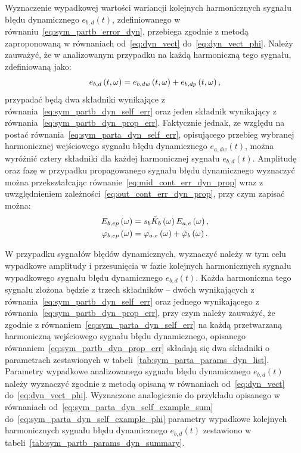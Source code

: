 Wyznaczenie wypadkowej wartości wariancji kolejnych harmonicznych sygnału błędu dynamicznego $e_{b,d}(t)$, zdefiniowanego w równaniu~\eqref{eq:sym_partb_error_dyn}, przebiega zgodnie z metodą zaproponowaną w równaniach od~\eqref{eq:dyn_vect} do~\eqref{eq:dyn_vect_phi}. Należy zauważyć, że w analizowanym przypadku na każdą harmoniczną tego sygnału, zdefiniowaną jako:
\begin{equation}
e_{b,d} \left(t, \omega\right) = e_{b,dw} \left(t, \omega\right) + e_{b,dp} \left(t, \omega\right) \label{eq:sym_partb_dyn_sum_err},
\end{equation}
przypadać będą dwa składniki wynikające z równania~\eqref{eq:sym_partb_dyn_self_err} oraz jeden składnik wynikający z równania~\eqref{eq:sym_partb_dyn_prop_err}. Faktycznie jednak, ze względu na postać równania~\eqref{eq:sym_parta_dyn_self_err}, opisującego przebieg wybranej harmonicznej wejściowego sygnału błędu dynamicznego $e_{a,dw}(t)$, można wyróżnić cztery składniki dla każdej harmonicznej sygnału $e_{b,d}(t)$. Amplitudę oraz fazę w przypadku propagowanego sygnału błędu dynamicznego wyznaczyć można przekształcając równanie~\eqref{eq:mid_cont_err_dyn_prop} wraz z uwzględnieniem zależności~\eqref{eq:out_cont_err_dyn_prop}, przy czym zapisać można:
\begin{gather}
E_{b,ep} \left(\omega\right) = s_{b} \tilde{K}_{b} \left(\omega\right) E_{a,e} \left(\omega\right) \label{eq:sym_partv_dyn_amp_omega}, \\
\varphi_{b,ep} \left(\omega\right) = \varphi_{a,e} \left(\omega\right) + \tilde{\varphi}_{b} \left(\omega\right) \label{eq:sym_partv_dyn_phi_omega}.
\end{gather}

W przypadku sygnałów błędów dynamicznych, wyznaczyć należy w tym celu wypadkowe amplitudy i przesunięcia w fazie kolejnych harmonicznych sygnału wypadkowego sygnału błędu dynamicznego $e_{b,d}(t)$. Każda harmoniczna tego sygnału złożona będzie z trzech składników -- dwóch wynikających z równania~\eqref{eq:sym_partb_dyn_self_err} oraz jednego wynikającego z równania~\eqref{eq:sym_partb_dyn_prop_err}, przy czym należy zauważyć, że zgodnie z równaniem~\eqref{eq:sym_parta_dyn_self_err} na każdą przetwarzaną harmoniczną wejściowego sygnału błędu dynamicznego, opisanego równaniem~\eqref{eq:sym_partb_dyn_prop_err} składają się dwa składniki o parametrach zestawionych w tabeli~\ref{tab:sym_parta_params_dyn_list}. Parametry wypadkowe analizowanego sygnału błędu dynamicznego $e_{b,d}(t)$ należy wyznaczyć zgodnie z metodą opisaną w równaniach od~\eqref{eq:dyn_vect} do~\eqref{eq:dyn_vect_phi}. Wyznaczone analogicznie do przykładu opisanego w równaniach od~\eqref{eq:sym_parta_dyn_self_example_sum} do~\eqref{eq:sym_parta_dyn_self_example_phi} parametry wypadkowe kolejnych harmonicznych sygnału błędu dynamicznego $e_{b,d}(t)$ zestawiono w tabeli~\ref{tab:sym_partb_params_dyn_summary}.

